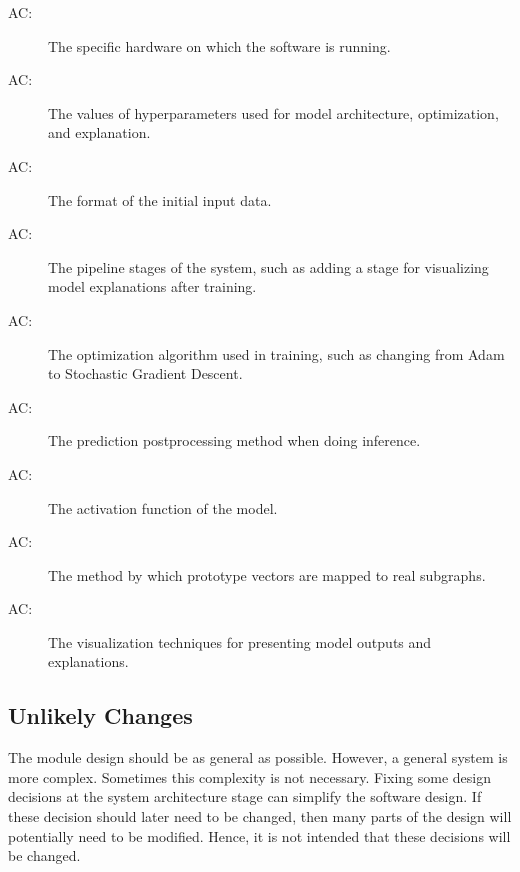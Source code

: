 \documentclass[12pt, titlepage]{article}
\newcounter{acnum}
\newcommand{\actheacnum}{AC\theacnum}
\begin{document}
\begin{description}
\item[ \actheacnum \label{acHardware}:] The specific
  hardware on which the software is running.
\item[ \actheacnum \label{acConfig}:]  The values of hyperparameters used for model architecture, optimization, and explanation.
\item[ \actheacnum \label{acInput}:] The format of the
  initial input data.
\item[ \actheacnum \label{acControl}:] The pipeline stages of the system, such as adding a stage for visualizing model explanations after training.

\item[ \actheacnum \label{acTrain}:] The optimization algorithm used in training, such as changing from Adam to Stochastic Gradient Descent.
\item[ \actheacnum \label{acInf}:] The prediction postprocessing method when doing inference. 
\item[ \actheacnum \label{acModel}:] The activation function of the model.
\item[ \actheacnum \label{acExp}:] The method by which prototype vectors are mapped to real subgraphs.
\item[ \actheacnum \label{acVil}:] The visualization techniques for presenting model outputs and explanations.
\end{description}

\subsection{Unlikely Changes} \label{SecUchange}

The module design should be as general as possible. However, a general system is
more complex. Sometimes this complexity is not necessary. Fixing some design
decisions at the system architecture stage can simplify the software design. If
these decision should later need to be changed, then many parts of the design
will potentially need to be modified. Hence, it is not intended that these
decisions will be changed.
\end{document}
